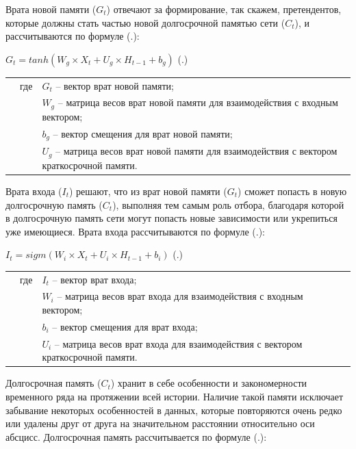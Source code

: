 {  \par \redline Врата новой памяти ($G_t$) отвечают за формирование, так скажем, претендентов, которые должны стать частью новой долгосрочной памятью сети ($C_t$), и рассчитываются по формуле (\thechaptercntr .\theformulacntr):

  \formulaspace \par \redline 
    $G_t = tanh(W_g \times X_t + U_g \times H_{t-1} + b_g)$
    \hfill (\thechaptercntr .\theformulacntr) \redline
  \formulaspace \addtocounter{formulacntr}{1}

  \begin{tabular}{p{}p{}p{}}
		& где  & $G_t$ {--} вектор врат новой памяти; \\
		& 	   & $W_g$ {--} матрица весов врат новой памяти для взаимодействия с входным вектором; \\
    & 	   & $b_g$ {--} вектор смещения для врат новой памяти; \\
    & 	   & $U_g$ {--} матрица весов врат новой памяти для взаимодействия с вектором краткосрочной памяти. \\
  \end{tabular}

  \par \redline Врата входа ($I_t$) решают, что из врат новой памяти ($G_t$) сможет попасть в новую долгосрочную память ($C_t$), выполняя тем самым роль отбора, благодаря которой в долгосрочную память сети могут попасть новые зависимости или укрепиться уже имеющиеся. Врата входа рассчитываются по формуле (\thechaptercntr .\theformulacntr):

  \formulaspace \par \redline 
    $I_t = sigm(W_i \times X_t + U_i \times H_{t-1} + b_i)$
    \hfill (\thechaptercntr .\theformulacntr) \redline
  \formulaspace \addtocounter{formulacntr}{1}

  \begin{tabular}{p{}p{}p{}}
		& где  & $I_t$ {--} вектор врат входа; \\
		& 	   & $W_i$ {--} матрица весов врат входа для взаимодействия с входным вектором; \\
    & 	   & $b_i$ {--} вектор смещения для врат входа; \\
    & 	   & $U_i$ {--} матрица весов врат входа для взаимодействия с вектором краткосрочной памяти. \\
  \end{tabular}

  \par \redline Долгосрочная память ($C_t$) хранит в себе особенности и закономерности временного ряда на протяжении всей истории. Наличие такой памяти исключает забывание некоторых особенностей в данных, которые повторяются очень редко или удалены друг от друга на значительном расстоянии относительно оси абсцисс. Долгосрочная память рассчитывается по формуле (\thechaptercntr .\theformulacntr):

}
